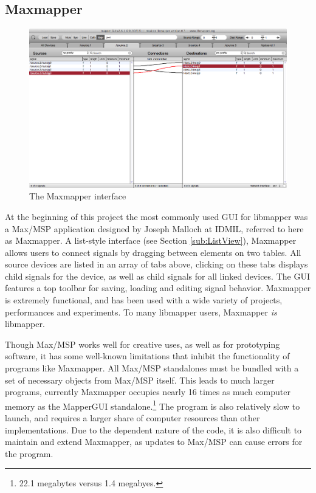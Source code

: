 	\subsection{Maxmapper} %
	\label{sub:maxmapper}

\begin{figure}[h]
	\centering
	\includegraphics[width=\textwidth]{figures/maxmapper}
	\caption{The Maxmapper interface}
	\label{fig:maxmapper}
\end{figure}

At the beginning of this project the most commonly used GUI for libmapper was a Max/MSP application designed by Joseph Malloch at IDMIL, referred to here as Maxmapper. A list-style interface (see Section \ref{sub:ListView}), Maxmapper allows users to connect signals by dragging between elements on two tables. All source devices are listed in an array of tabs above, clicking on these tabs displays child signals for the device, as well as child signals for all linked devices. The GUI features a top toolbar for saving, loading and editing signal behavior. Maxmapper is extremely functional, and has been used with a wide variety of projects, performances and experiments. To many libmapper users, Maxmapper \emph{is} libmapper.
	
Though Max/MSP works well for creative uses, as well as for prototyping software, it has some well-known limitations that inhibit the functionality of programs like Maxmapper. All Max/MSP standalones must be bundled with a set of necessary objects from Max/MSP itself. This leads to much larger programs, currently Maxmapper occupies nearly 16 times as much computer memory as the MapperGUI standalone.\footnote{22.1 megabytes versus 1.4 megabyes.} The program is also relatively slow to launch, and requires a larger share of computer resources than other implementations. Due to the dependent nature of the code, it is also difficult to maintain and extend Maxmapper, as updates to Max/MSP can cause errors for the program.

